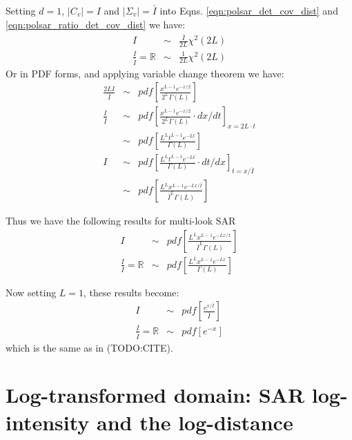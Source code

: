 Setting $d=1$, $|C_v|=I$ and $|\Sigma_v|=\bar{I}$ into Eqns. \ref{eqn:polsar_det_cov_dist} and \ref{eqn:polsar_ratio_det_cov_dist}
we have:
\begin{eqnarray*}
  I &\sim& \frac{\bar{I}}{2L} \chi^2(2L)  \\
  \frac{I}{\bar{I}} = \mathbb{R} &\sim& \frac{1}{2L}  \chi^2(2L)   
\end{eqnarray*}
Or in PDF forms, and applying variable change theorem we have:
\begin{eqnarray*}
    \frac{2L I}{\bar{I}} &\sim& pdf \left[ \frac{x^{L-1}e^{-x/2}}{2^L \Gamma(L)} \right] \\
  \frac{I}{\bar{I}} &\sim& pdf \left[ \frac{x^{L-1}e^{-x/2}}{2^L \Gamma(L)} \cdot dx/dt \right]_{x=2L \cdot t} \\
    &\sim& pdf \left[ \frac{ L^{L} t^{L-1} e^{-Lt}}{ \Gamma(L)} \right] \\
  I &\sim& pdf \left[ \frac{ L^{L} t^{L-1} e^{-Lt}}{ \Gamma(L)} \cdot dt/dx \right]_{t=x/\bar{I}}  \\
    &\sim& pdf \left[ \frac{ L^{L} x^{L-1} e^{-Lx/\bar{I}}}{ \bar{I}^{L}\Gamma(L)} \right]
\end{eqnarray*}

Thus we have the following results for multi-look SAR
\begin{eqnarray}
    I &\sim& pdf \left[ \frac{ L^{L} x^{L-1} e^{-Lx/\bar{x}}}{ \bar{I}^{L}\Gamma(L)} \right] \label{eqn:multi_look_SAR_intensity_dist} \\
    \frac{I}{\bar{I}} = \mathbb{R} &\sim& pdf \left[ \frac{ L^{L} x^{L-1} e^{-Lx}}{ \Gamma(L)} \label{eqn:multi_look_SAR_ratio_dist} \right] 
\end{eqnarray}

Now setting $L=1$, these results become:
\begin{eqnarray}
    I &\sim& pdf \left[ \frac{ e^{x/\bar{I}}}{ \bar{I}} \right] \\
    \frac{I}{\bar{I}} = \mathbb{R} &\sim& pdf \left[ e^{-x} \right] 
\end{eqnarray}
which is the same as in (TODO:CITE).

\section{Log-transformed domain: SAR log-intensity and the log-distance}

